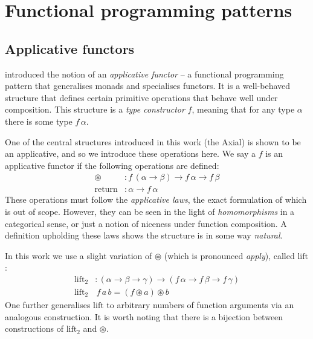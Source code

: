 \section{Functional programming patterns}
\label{functional-programming-patterns}

\subsection{Applicative functors}

\textcite{mcbride2008applicative} introduced the notion of an \textit{applicative functor} -- a functional programming pattern that generalises monads and specialises functors. It is a well-behaved structure that defines certain primitive operations that behave well under composition. This structure is a \textit{type constructor} $f$, meaning that for any type $\alpha$ there is some type $f\,\alpha$.

One of the central structures introduced in this work (the Axial) is shown to be an applicative, and so we introduce these operations here. We say a $f$ is an applicative functor if the following operations are defined:
\begin{align*}
\circledast &: f\,(\alpha \to \beta) \to f\,\alpha \to f\,\beta \\
\mathrm{return} &: \alpha \to f\,\alpha
\end{align*}
These operations must follow the \textit{applicative laws}, the exact formulation of which is out of scope. However, they can be seen in the light of \textit{homomorphisms} in a categorical sense, or just a notion of niceness under function composition. A definition upholding these laws shows the structure is in some way \textit{natural}. 

In this work we use a slight variation of $\circledast$ (which is pronounced \textit{apply}), called $\mathrm{lift}$:
\begin{align*}
\mathrm{lift}_2& : (\alpha \to \beta \to \gamma) \to (f\,\alpha \to f\,\beta \to f\,\gamma) \\ 
\mathrm{lift}_2&\,f\,a\,b = (f \circledast a) \circledast b
\end{align*}
One further generalises $\mathrm{lift}$ to arbitrary numbers of function arguments via an analogous construction. It is worth noting that there is a bijection between constructions of $\mathrm{lift}_2$ and $\circledast$.

